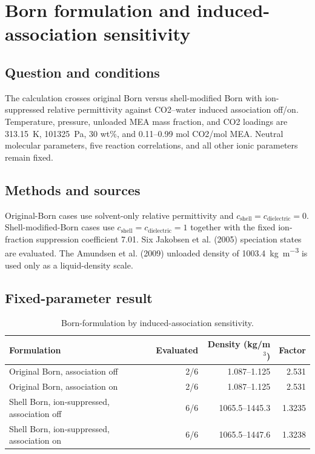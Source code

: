 \section{Born formulation and induced-association sensitivity}

\subsection{Question and conditions}

The calculation crosses original Born versus shell-modified Born with
ion-suppressed relative permittivity against CO2--water induced association
off/on. Temperature, pressure, unloaded MEA mass fraction, and CO2 loadings are
\SI{313.15}{\kelvin}, \SI{101325}{\pascal}, 30 wt\%, and 0.11--0.99 mol
CO2/mol MEA. Neutral molecular parameters, five reaction correlations, and all
other ionic parameters remain fixed.

\subsection{Methods and sources}

Original-Born cases use solvent-only relative permittivity and
$c_{\mathrm{shell}}=c_{\mathrm{dielectric}}=0$. Shell-modified-Born cases use
$c_{\mathrm{shell}}=c_{\mathrm{dielectric}}=1$ together with the fixed
ion-fraction suppression coefficient 7.01. Six Jakobsen et al. (2005)
speciation states are evaluated. The Amundsen et al. (2009) unloaded density of
\SI{1003.4}{\kilogram\per\cubic\metre} is used only as a liquid-density scale.

\subsection{Fixed-parameter result}

\begin{table}[ht]
\centering
\caption{Born-formulation by induced-association sensitivity.}
\begin{tabular}{lrrr}
\toprule
Formulation & Evaluated & Density (kg/m$^3$) & Factor \\
\midrule
Original Born, association off & 2/6 & 1.087--1.125 & 2.531 \\
Original Born, association on & 2/6 & 1.087--1.125 & 2.531 \\
Shell Born, ion-suppressed, association off & 6/6 & 1065.5--1445.3 & 1.3235 \\
Shell Born, ion-suppressed, association on & 6/6 & 1065.5--1447.6 & 1.3238 \\
\bottomrule
\end{tabular}
\end{table}

